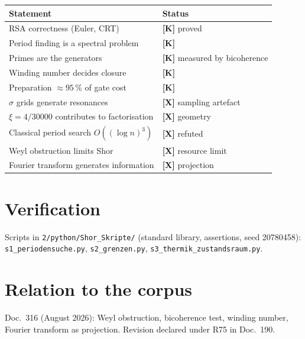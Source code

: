 \begin{center}
\begin{tabular}{ll}
\toprule
Statement & Status \\
\midrule
RSA correctness (Euler, CRT) & \textbf{[K]} proved \\
Period finding is a spectral problem & \textbf{[K]} \\
Primes are the generators & \textbf{[K]} measured by bicoherence \\
Winding number decides closure & \textbf{[K]} \\
Preparation $\approx 95\,\%$ of gate cost & \textbf{[K]} \\
$\sigma$ grids generate resonances & \textbf{[X]} sampling artefact \\
$\xi=4/30000$ contributes to factorisation & \textbf{[X]} geometry \\
Classical period search $O((\log n)^3)$ & \textbf{[X]} refuted \\
Weyl obstruction limits Shor & \textbf{[X]} resource limit \\
Fourier transform generates information & \textbf{[X]} projection \\
\bottomrule
\end{tabular}
\end{center}

\section{Verification}

Scripts in \texttt{2/python/Shor\_Skripte/} (standard library,
assertions, seed 20780458): \texttt{s1\_periodensuche.py},
\texttt{s2\_grenzen.py}, \texttt{s3\_thermik\_zustandsraum.py}.

\section{Relation to the corpus}

Doc.~316 (August 2026): Weyl obstruction, bicoherence test, winding
number, Fourier transform as projection. Revision declared under R75
in Doc.~190.
